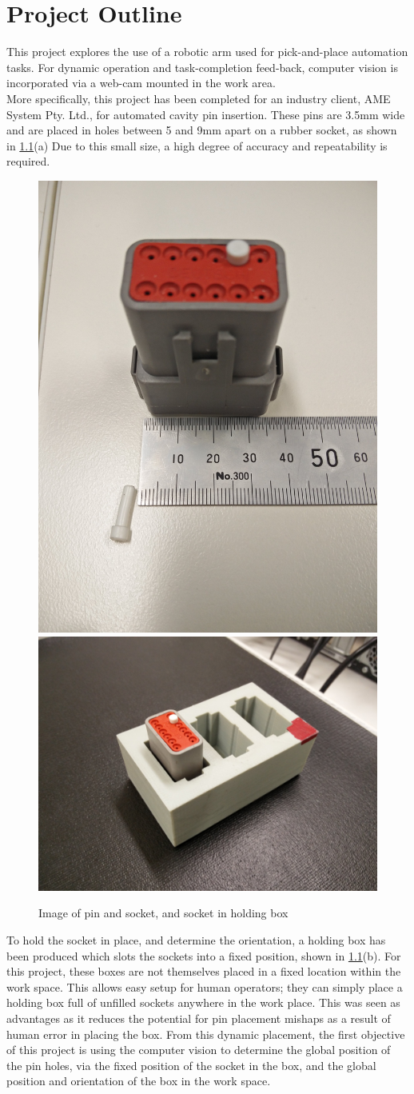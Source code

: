 \documentclass[11pt,a4paper, margin=1in]{report}
\begin{document}
\chapter{Project Outline}
This project explores the use of a robotic arm used for pick-and-place automation tasks. For dynamic operation and task-completion feed-back, computer vision is incorporated via a web-cam mounted in the work area.\\
More specifically, this project has been completed for an industry client, AME System Pty. Ltd., for automated cavity pin insertion. These pins are 3.5mm wide and are placed in holes between 5 and 9mm apart on a rubber socket, as shown in \cref{fig:IMG_20160908_142218}(a) Due to this small size, a high degree of accuracy and repeatability is required.\\
\begin{figure}[h]
\centering
\includegraphics[width=0.2\linewidth]{IMG_20160908_142218} %
\includegraphics[width=0.38\linewidth]{IMG_20160912_135721}
\caption{Image of pin and socket, and socket in holding box}
\label{fig:IMG_20160908_142218}
\end{figure}
To hold the socket in place, and determine the orientation, a holding box has been produced which slots the sockets into a fixed position, shown in \cref{fig:IMG_20160908_142218}(b). For this project, these boxes are not themselves placed in a fixed location within the work space. This allows easy setup for human operators; they can simply place a holding box full of unfilled sockets anywhere in the work place. This was seen as advantages as it reduces the potential for pin placement mishaps as a result of human error in placing the box. From this dynamic placement, the first objective of this project is using the computer vision to determine the global position of the pin holes, via the fixed position of the socket in the box, and the global position and orientation of the box in the work space.\\
\end{document}
